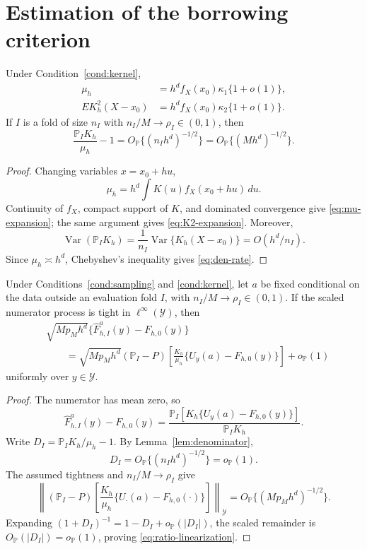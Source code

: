 \section{Estimation of the borrowing criterion}
\label{sec:supp-gain}

\begin{lemma}
\label{lem:denominator}
Under Condition~\ref{cond:kernel},
\begin{align}
\mu_h
&=h^df_X(x_0)\kappa_1\{1+o(1)\},
\label{eq:mu-expansion}\\
E K_h^2(X-x_0)
&=h^df_X(x_0)\kappa_2\{1+o(1)\}.
\label{eq:K2-expansion}
\end{align}
If \(I\) is a fold of size \(n_I\) with \(n_I/M\to\rho_I\in(0,1)\), then
\begin{equation}
\frac{\mathbb P_IK_h}{\mu_h}-1
=O_{\mathbb P}\{(n_Ih^d)^{-1/2}\}
=O_{\mathbb P}\{(Mh^d)^{-1/2}\}.
\label{eq:den-rate}
\end{equation}
\end{lemma}

\begin{proof}
Changing variables \(x=x_0+hu\),
\[
\mu_h=h^d\int K(u)f_X(x_0+hu)\,du.
\]
Continuity of \(f_X\), compact support of \(K\), and dominated convergence give \eqref{eq:mu-expansion}; the same argument gives \eqref{eq:K2-expansion}. Moreover,
\[
\operatorname{Var}(\mathbb P_IK_h)
=\frac1{n_I}\operatorname{Var}\{K_h(X-x_0)\}
=O(h^d/n_I).
\]
Since \(\mu_h\asymp h^d\), Chebyshev's inequality gives \eqref{eq:den-rate}.
\end{proof}

\begin{lemma}
\label{lem:ratio}
Under Conditions~\ref{cond:sampling} and \ref{cond:kernel}, let \(a\) be fixed
conditional on the data outside an evaluation fold \(I\), with
\(n_I/M\to\rho_I\in(0,1)\). If the scaled numerator process is tight in
\(\ell^\infty(\mathcal Y)\), then
\begin{align}
&\sqrt{Mp_Mh^d}
\{\widehat F_{h,I}^{a}(y)-F_{h,0}(y)\}
\nonumber\\
&\qquad=
\sqrt{Mp_Mh^d}
(\mathbb P_I-P)
\left[
\frac{K_h}{\mu_h}
\{U_y(a)-F_{h,0}(y)\}
\right]
+o_{\mathbb P}(1)
\label{eq:ratio-linearization}
\end{align}
uniformly over \(y\in\mathcal Y\).
\end{lemma}

\begin{proof}
The numerator has mean zero, so
\[
\widehat F_{h,I}^{a}(y)-F_{h,0}(y)
=
\frac{\mathbb P_I[K_h\{U_y(a)-F_{h,0}(y)\}]}{\mathbb P_IK_h}.
\]
Write \(D_I=\mathbb P_IK_h/\mu_h-1\). By Lemma~\ref{lem:denominator},
\[
D_I=O_{\mathbb P}\{(n_Ih^d)^{-1/2}\}=o_{\mathbb P}(1).
\]
The assumed tightness and \(n_I/M\to\rho_I\) give
\[
\left\|
(\mathbb P_I-P)
\left[
\frac{K_h}{\mu_h}\{U_\cdot(a)-F_{h,0}(\cdot)\}
\right]
\right\|_{\mathcal Y}
=O_{\mathbb P}\{(Mp_Mh^d)^{-1/2}\}.
\]
Expanding \((1+D_I)^{-1}=1-D_I+o_{\mathbb P}(|D_I|)\), the scaled remainder is \(O_{\mathbb P}(|D_I|)=o_{\mathbb P}(1)\), proving \eqref{eq:ratio-linearization}.
\end{proof}

